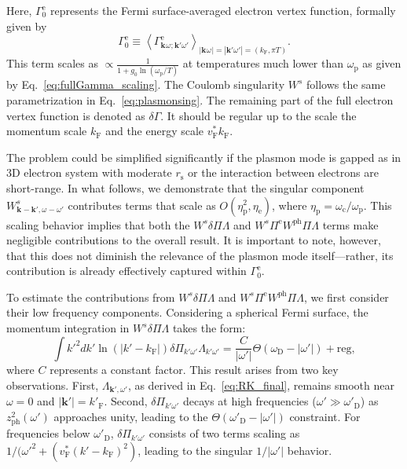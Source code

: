 \documentclass[%
 reprint,
superscriptaddress,
 amsmath,amssymb,
 aps,
prx,
]{revtex4-2}
\newcommand{\bk}{\mathbf{k}}
\newcommand{\txc}{\text{c}}
\newcommand{\txe}{\text{e}}
\newcommand{\txp}{\text{p}}
\newcommand{\txs}{\text{s}}
\newcommand{\txD}{\text{D}}
\newcommand{\txF}{\text{F}}
\newcommand{\txph}{\text{ph}}
\newcommand{\pcf}{\Lambda} %
\begin{document}
\begin{appendices}
Here, $\Gamma^{\txe}_0$ represents the Fermi surface-averaged electron vertex function, formally given by 
\begin{equation}
\Gamma^{\txe}_0 \equiv \left<\Gamma^{\txe}_{\bk^{}\omega^{};\bk'\omega'}\right>_{|\bk^{}\omega^{}|=|\bk'\omega'|=(k_{\txF}, \pi T)}.
\label{eq:gamma4average}
\end{equation}
This term scales as $\propto \frac{1}{1+g_0\ln(\omega_\txp/T)}$ at temperatures
much lower than $\omega_\txp$ as given by Eq.~\eqref{eq:fullGamma_scaling}. The Coulomb singularity $W^{s}$ follows the same parametrization in Eq.~\eqref{eq:plasmonsing}. The remaining part of the full electron vertex function is denoted as $\delta{\Gamma}$. It should be regular up to the scale the momentum scale $k_{\txF}$ and the energy scale $v_{\txF}^* k_{\txF}$.




The problem could be simplified significantly if the plasmon mode is gapped as in 3D electron system with moderate $r_\txs$ or the interaction between electrons are short-range.
In what follows, we demonstrate that the singular component $W^s_{\bk^{}-\bk', \omega^{}-\omega'}$ contributes terms that scale as $O(\eta_\txp^2,\eta_\txe)$, where $\eta_\txp=\omega_\txc/\omega_\txp$.  This scaling behavior implies that both the $W^s\delta\Pi \pcf$ and $W^s\Pi^{\txe}W^{\txph}\Pi \pcf$ terms make negligible contributions to the overall result. It is important to note, however, that this does not diminish the relevance of the plasmon mode itself—rather, its contribution is already effectively captured within $\Gamma_0^{\txe}$.



To estimate the contributions from $W^s\delta\Pi \pcf$ and $W^s\Pi^{\txe}W^{\txph}\Pi \pcf$, we first consider their low frequency components. 
Considering a spherical Fermi surface, the momentum integration in $W^s\delta\Pi \pcf$ takes the form:
\begin{equation}
\int k'^2dk' \ln(|k'-k_\txF|)\delta\Pi_{k' \omega'}\pcf_{k'\omega'}
=\frac{C}{|\omega'|}\Theta(\omega_\txD-|\omega'|)+\text{reg},
\end{equation}
where $C$ represents a constant factor. 
This result arises from two key observations. 
First, $\pcf_{\bk',\omega'}$, as derived in Eq.~\eqref{eq:RK_final}, remains smooth near $\omega=0$ and $|\bk'|=k'_{\txF}$. 
Second, $\delta\Pi_{k' \omega'}$ decays at high frequencies ($\omega' \gg \omega'_\txD$) as ${z_{\txph}^2(\omega')}$ approaches unity, leading to the $\Theta(\omega'_\txD-|\omega'|)$ constraint. 
For frequencies below $\omega'_\txD$, $\delta\Pi_{k' \omega'}$ consists of two terms scaling as $1/(\omega'^2 + (v_{\txF}^*(k'-k_\txF)^2)$, leading to the singular $1/|\omega'|$ behavior.


\end{appendices}
\end{document}
